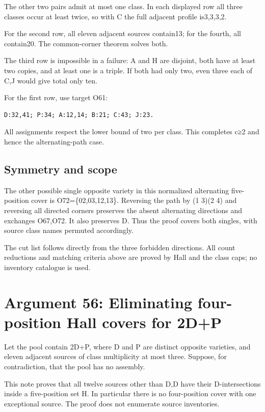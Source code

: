 \documentclass[
  10pt,
]{article}
\begin{document}
The other two pairs admit at most one class. In each displayed row all
three classes occur at least twice, so with C the full adjacent profile
is3,3,3,2.

For the second row, all eleven adjacent sources contain13; for the
fourth, all contain20. The common-corner theorem solves both.

The third row is impossible in a failure: A and H are disjoint, both
have at least two copies, and at least one is a triple. If both had only
two, even three each of C,J would give total only ten.

For the first row, use target O61:

\begin{verbatim}
D:32,41; P:34; A:12,14; B:21; C:43; J:23.
\end{verbatim}

All assignments respect the lower bound of two per class. This completes
c≥2 and hence the alternating-path case.

\hypertarget{symmetry-and-scope}{%
\subsection*{Symmetry and scope}\label{symmetry-and-scope}}

The other possible single opposite variety in this normalized
alternating five-position cover is O72=\{02,03,12,13\}. Reversing the
path by (1 3)(2 4) and reversing all directed corners preserves the
absent alternating directions and exchanges O67,O72. It also preserves
D. Thus the proof covers both singles, with source class names permuted
accordingly.

The cut list follows directly from the three forbidden directions. All
count reductions and matching criteria above are proved by Hall and the
class caps; no inventory catalogue is used.

\hypertarget{arg-56}{%
\section{Argument 56: Eliminating four-position Hall covers for
2D+P}\label{arg-56}}

Let the pool contain 2D+P, where D and P are distinct opposite
varieties, and eleven adjacent sources of class multiplicity at most
three. Suppose, for contradiction, that the pool has no assembly.

This note proves that all twelve sources other than D,D have their
D-intersections inside a five-position set H. In particular there is no
four-position cover with one exceptional source. The proof does not
enumerate source inventories.
\end{document}

